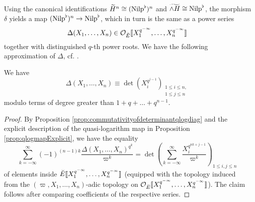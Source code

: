 \documentclass[../main.tex]{subfiles}
\begin{document}
Using the canonical identifications $\widetilde{H}^n \cong ({\mathrm{Nilp}}^\flat)^n$
and $\widetilde{\wedge H} \cong {\mathrm{Nilp}}^\flat$, the morphism $\delta$ yields a 
map $({\mathrm{Nilp}}^\flat)^n \to {\mathrm{Nilp}}^\flat$, which in turn is the same as a power series 
\begin{equation*}
  \Delta(X_1, \dots, X_n) \in \mathcal{O}_{\breve E}\llbracket X_1^{q^{-\infty}}, \dots,
  X_n^{q^{-\infty}}\rrbracket
\end{equation*}
together with distinguished $q$-th power roots. 
We have the following approximation of $\Delta$, cf. \cite[Lemma 2.10.4]{BoyarchenkoWeinstein2011MaxVar}. 
\begin{lem}\label{lem:DeltaApprox}
  We have 
  \begin{equation*}
    \Delta(X_1, \dots, X_n) \equiv \det(X_i^{q^{j-1}})_{\substack{1 \leq
  i \leq n,\\ 1 \leq j \leq n}} 
  \end{equation*}
  modulo terms of degree greater than $1 + q + \dots + q^{n-1}$.
\begin{proof}
  By Proposition \ref{prop:commutativityofdeterminantqlogdiag} and 
  the explicit description of the quasi-logarithm map in Proposition
  \ref{prop:qlogmapExplicit}, we have the equality
  \begin{equation*}
    \sum_{k = -\infty}^\infty (-1)^{(n-1) k} \frac{\Delta(X_1, \dots,
    X_n)^{q^k}}{\varpi^k} = 
    \det \left( \sum_{k = -\infty}^\infty
    \frac{X_i^{q^{nk + j-1}}}{\varpi^k} \right)_{1 \leq i, j \leq n}
  \end{equation*}
  of elements inside ${\breve {E}} \llbracket X_1^{q^{-\infty}}, \dots, X_n^{q^{-\infty}} \rrbracket$
  (equipped with the topology induced from the 
  $(\varpi, X_1, \allowbreak \dots, X_n)$-adic topology on $\mathcal{O}_{\breve {E}}\llbracket
  X_1^{q^{-\infty}}, \dots, X_n^{q^{-\infty}} \rrbracket$).
  The claim follows after comparing coefficients of the respective series. 
\end{proof}
\end{lem}


\end{document}
